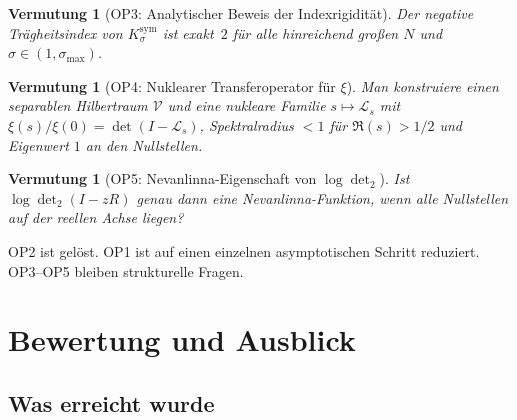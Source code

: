 \documentclass[12pt,a4paper]{article}
\newtheorem{conjecture}[theorem]{Vermutung}
\theoremstyle{definition}
\theoremstyle{remark}
\begin{document}
\begin{conjecture}[OP3: Analytischer Beweis der Indexrigidität]
Der negative Trägheitsindex von $K_\sigma^{\mathrm{sym}}$ ist exakt~$2$
für alle hinreichend großen $N$ und
$\sigma \in (1, \sigma_{\max})$.
\end{conjecture}

\begin{conjecture}[OP4: Nuklearer Transferoperator für $\xi$]
Man konstruiere einen separablen Hilbertraum $\mathcal{V}$ und eine
nukleare Familie $s \mapsto \mathcal{L}_s$ mit
$\xi(s)/\xi(0) = \det(I - \mathcal{L}_s)$, Spektralradius $< 1$ für
$\Re(s) > 1/2$ und Eigenwert $1$ an den Nullstellen.
\end{conjecture}

\begin{conjecture}[OP5: Nevanlinna-Eigenschaft von $\log\det_2$]
Ist $\log\det_2(I - zR)$ genau dann eine Nevanlinna-Funktion, wenn alle
Nullstellen auf der reellen Achse liegen?
\end{conjecture}

\noindent OP2 ist gelöst. OP1 ist auf einen einzelnen asymptotischen
Schritt reduziert. OP3--OP5 bleiben strukturelle Fragen.


\section{Bewertung und Ausblick}
\label{sec:outlook}

\subsection{Was erreicht wurde}
\end{document}
